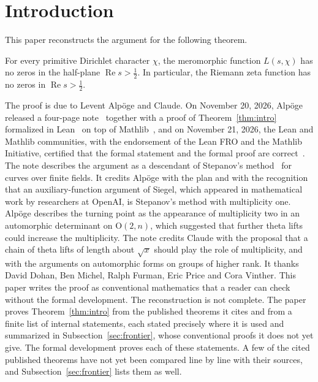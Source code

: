 \section{Introduction}\label{sec:intro}

This paper reconstructs the argument for the following theorem.

\begin{theorem}\label{thm:intro}
For every primitive Dirichlet character $\chi$, the meromorphic function $L(s,\chi)$ has no zeros in the half-plane $\operatorname{Re}s>\frac12$. In particular, the Riemann zeta function has no zeros in $\operatorname{Re}s>\frac12$.
\end{theorem}

The proof is due to Levent Alpöge and Claude. On November 20, 2026, Alpöge released a four-page note~\cite{note} together with a proof of Theorem~\ref{thm:intro} formalized in Lean~\cite{lean4} on top of Mathlib~\cite{mathlib}, and on November 21, 2026, the Lean and Mathlib communities, with the endorsement of the Lean FRO and the Mathlib Initiative, certified that the formal statement and the formal proof are correct~\cite{leanstatement}. The note describes the argument as a descendant of Stepanov's method~\cite{stepanov} for curves over finite fields. It credits Alpöge with the plan and with the recognition that an auxiliary-function argument of Siegel, which appeared in mathematical work by researchers at OpenAI, is Stepanov's method with multiplicity one. Alpöge describes the turning point as the appearance of multiplicity two in an automorphic determinant on $\mathrm O(2,n)$, which suggested that further theta lifts could increase the multiplicity. The note credits Claude with the proposal that a chain of theta lifts of length about $\sqrt x$ should play the role of multiplicity, and with the arguments on automorphic forms on groups of higher rank. It thanks David Dohan, Ben Michel, Ralph Furman, Eric Price and Cora Vinther. This paper writes the proof as conventional mathematics that a reader can check without the formal development. The reconstruction is not complete. The paper proves Theorem~\ref{thm:intro} from the published theorems it cites and from a finite list of internal statements, each stated precisely where it is used and summarized in Subsection~\ref{sec:frontier}, whose conventional proofs it does not yet give. The formal development proves each of these statements. A few of the cited published theorems have not yet been compared line by line with their sources, and Subsection~\ref{sec:frontier} lists them as well.

